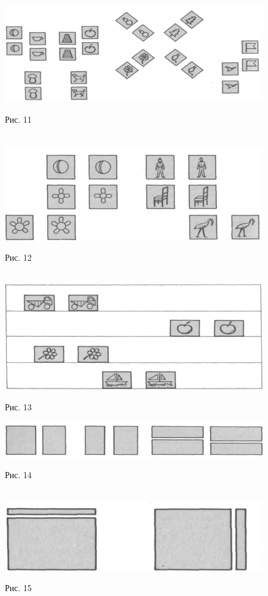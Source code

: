 \documentclass{book}
\begin{document}
\begin{figure}
\centering
\includegraphics[width=\linewidth]{media/media/image11.png}
\caption*{Рис. 11}
~\\

\centering
\includegraphics[width=\linewidth]{media/media/image12.png}
\caption*{Рис. 12}
~\\

\centering
\includegraphics[width=\linewidth]{media/media/image13.png}
\caption*{Рис. 13}
\end{figure}

\begin{figure}
\centering
\includegraphics[width=\linewidth]{media/media/image14.png}
\caption*{Рис. 14}
~\\

\centering
\includegraphics[width=0.7\linewidth]{media/media/image15.png}
\caption*{Рис. 15}
\end{figure}
\end{document}
